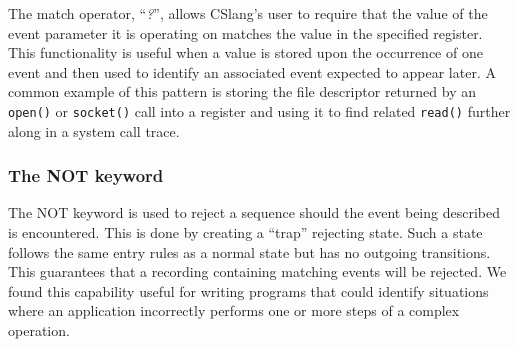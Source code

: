 The match operator, ``\textit{?}'', allows CSlang's user to
require that the value of the event parameter it is operating on matches
the value in the specified register.  This functionality is
useful when a value is stored upon the occurrence of one event
and then used to identify an associated event expected to appear later.
A common example of this pattern is storing the file descriptor
returned by an {\tt open()} or {\tt socket()} call into a register
and using it to find related {\tt read()} further along in a system call
trace.

\subsubsection{The NOT keyword}
\label{subsub:NOT}

The NOT keyword is used to reject a sequence should the event being
described is encountered.  This is done by creating a ``trap''
rejecting state.  Such a state follows the same entry rules
as a normal state but has no outgoing transitions.  This guarantees that a
recording containing matching events will be rejected.
We found this capability useful for writing programs that could identify
situations where an application incorrectly performs one or more steps of a
complex operation.




